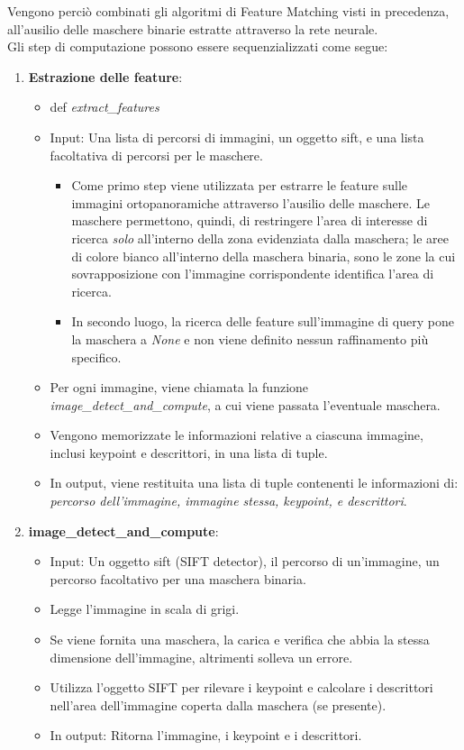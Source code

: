 \documentclass[12pt,a4paper,openright,twoside]{book}
\begin{document}
Vengono perciò combinati gli algoritmi di Feature Matching visti in precedenza, all'ausilio delle maschere binarie estratte attraverso la rete neurale.\\
Gli step di computazione possono essere sequenzializzati come segue:
\begin{enumerate}
\item \textbf{Estrazione delle feature}:
\begin{itemize}
\item def {\itshape extract\_features}
\item Input: Una lista di percorsi di immagini, un oggetto sift, e una lista facoltativa di percorsi per le maschere.
\begin{itemize}
\item Come primo step viene utilizzata per estrarre le feature sulle immagini ortopanoramiche attraverso l'ausilio delle maschere. Le maschere permettono, quindi, di restringere l'area di interesse di ricerca {\itshape solo} all'interno della zona evidenziata dalla maschera; le aree di colore bianco all'interno della maschera binaria, sono le zone la cui sovrapposizione con l'immagine corrispondente identifica l'area di ricerca.
\item In secondo luogo, la ricerca delle feature sull'immagine di query pone la maschera a {\itshape None} e non viene definito nessun raffinamento più specifico.
\end{itemize}
\item Per ogni immagine, viene chiamata la funzione {\itshape image\_detect\_and\_compute}, a cui viene passata l'eventuale maschera.
\item Vengono memorizzate  le informazioni relative a ciascuna immagine, inclusi keypoint e descrittori, in una lista di tuple.
\item In output, viene restituita una lista di tuple contenenti le informazioni di: {\itshape percorso dell'immagine, immagine stessa, keypoint, e descrittori}.
\end{itemize}

\item \textbf{image\_detect\_and\_compute}:
\begin{itemize}
\item Input: Un oggetto sift (SIFT detector), il percorso di un'immagine, un percorso facoltativo per una maschera binaria.
\item Legge l'immagine in scala di grigi.
\item Se viene fornita una maschera, la carica e verifica che abbia la stessa dimensione dell'immagine, altrimenti solleva un errore.
\item Utilizza l'oggetto SIFT per rilevare i keypoint e calcolare i descrittori nell'area dell'immagine coperta dalla maschera (se presente).
\item In output: Ritorna l'immagine, i keypoint e i descrittori.
\begin{figure}[H]
	\centering
    	
\end{figure} 
\end{itemize}


\end{enumerate}
\end{document}

